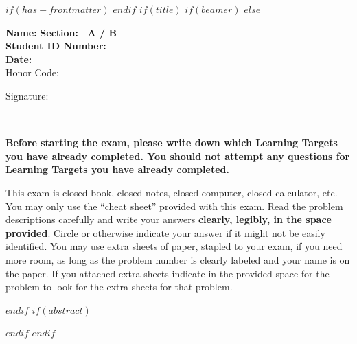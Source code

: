$if(has-frontmatter)$
\frontmatter
$endif$
$if(title)$
$if(beamer)$
\frame{\titlepage}
$else$
\maketitle

\newcommand{\littleblank}{\rule{.5in}{.01in}~~}
\newcommand{\bigblank}{\rule{2.5in}{.01in}~~}
\renewcommand{\setminus}{\backslash}


\raggedbottom

\vspace{-.6in}

\textbf{Name:} \underline{\hspace*{3in}} 
\hfill
\textbf{Section:~ A / B} ~ ~ ~ \\[2mm]

\textbf{Student ID Number:} \underline{\hspace*{3in}} \\[2mm]

\textbf{Date:} \underline{\hspace*{1.5in}} \\ 

{\Large{Honor Code:}}
\vspace{.6in}

Signature: \bigblank\\

\textbf{Before starting the exam, please write down which Learning Targets you have already completed. You should not attempt any questions for Learning Targets you have already completed.}


This exam is closed book, closed notes, closed computer, closed calculator,
etc. 
You may only use the ``cheat sheet'' provided with this exam. 
Read the problem descriptions carefully and write your answers \textbf{clearly, legibly, in the space provided}. 
Circle or otherwise indicate your answer if it might not be easily identified. 
You may use extra sheets of paper, stapled to your exam, if you need more room, as long as the problem number is clearly labeled and your name is on the paper. 
If you attached extra sheets indicate in the provided space for the problem to look for the extra sheets for that problem.

\pagebreak

$endif$
$if(abstract)$
\begin{abstract}
$abstract$
\end{abstract}
$endif$
$endif$


